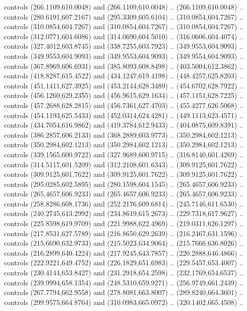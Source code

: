 \begin{scope}[shift={(-162.56685,-567.58888)}]
\begin{scope}
      controls (266.1109,610.0048) and (266.1109,610.0048) .. (266.1109,610.0048) ..
      controls (280.6191,607.2167) and (295.3309,605.6104) .. (310.0854,604.7267) ..
      controls (310.0854,604.7267) and (310.0854,604.7267) .. (310.0854,604.7267) ..
      controls (312.0771,604.6086) and (314.0690,604.5010) .. (316.0606,604.4074) ..
      controls (327.4012,603.8745) and (338.7255,603.7923) .. (349.9553,604.9093) ..
      controls (349.9553,604.9093) and (349.9553,604.9093) .. (349.9554,604.9093) ..
      controls (367.8969,606.6931) and (385.8093,608.8498) .. (403.5004,612.3862) ..
      controls (418.8287,615.4522) and (434.1247,619.4198) .. (448.4257,625.8203) ..
      controls (451.1411,627.3925) and (453.2144,628.3489) .. (454.6702,628.7922) ..
      controls (456.1260,629.2355) and (456.9615,629.1634) .. (457.1151,628.7225) ..
      controls (457.2688,628.2815) and (456.7361,627.4703) .. (455.4277,626.5068) ..
      controls (454.1193,625.5433) and (452.0314,624.4281) .. (449.1113,623.4571) ..
      controls (434.7054,616.9862) and (419.3784,612.9433) .. (404.0875,609.8391) ..
      controls (386.2857,606.2133) and (368.2889,603.9773) .. (350.2984,602.1213) ..
      controls (350.2984,602.1213) and (350.2984,602.1213) .. (350.2984,602.1213) ..
      controls (339.1565,600.9722) and (327.9689,600.9715) .. (316.8140,601.4269) ..
      controls (314.5117,601.5209) and (312.2108,601.6343) .. (309.9125,601.7622) ..
      controls (309.9125,601.7622) and (309.9125,601.7622) .. (309.9125,601.7622) ..
      controls (295.0285,602.5895) and (280.1598,604.1545) .. (265.4657,606.9233) ..
      controls (265.4657,606.9233) and (265.4657,606.9233) .. (265.4657,606.9233) ..
      controls (258.8286,608.1736) and (252.2176,609.6814) .. (245.7146,611.6530) ..
      controls (240.2745,613.2992) and (234.8619,615.2673) .. (229.7318,617.9627) ..
      controls (225.8598,619.9709) and (221.9988,622.4969) .. (219.0311,626.1297) ..
      controls (217.8531,627.5789) and (216.8650,629.2639) .. (216.2467,631.1596) ..
      controls (215.6690,632.9733) and (215.5023,634.9064) .. (215.7666,636.8026) ..
      controls (216.2899,640.4224) and (217.9245,643.7857) .. (220.2888,646.4866) ..
      controls (222.9221,649.4752) and (226.1829,651.6983) .. (229.5457,653.4007) ..
      controls (230.4144,653.8427) and (231.2918,654.2598) .. (232.1769,654.6537) ..
      controls (239.9994,658.1354) and (248.5310,659.9271) .. (256.9749,661.2439) ..
      controls (267.7794,662.9558) and (278.8081,663.8007) .. (289.8240,664.3601) ..
      controls (299.9575,664.8764) and (310.0983,665.0972) .. (320.1402,665.4508) ..

\end{scope}
\end{scope}
